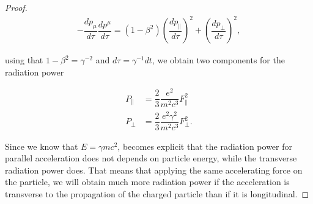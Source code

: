 \documentclass[../sands-adaptation.tex]{subfiles}
\begin{document}
\begin{proof}
 \begin{align*}
 -\dfrac{d{p_\mu}}{d\tau}\dfrac{dp^\mu}{d\tau} = (1- \beta^2)\left(\dfrac{dp_\parallel}{d\tau}\right)^2 + \left(\dfrac{dp_\perp}{d\tau}\right)^2,
 \end{align*}

 using that $1-\beta^2 = \gamma^{-2}$ and $d\tau = \gamma^{-1}dt$, we obtain two components for the radiation power

\begin{align*}
P_\parallel &=   \dfrac{2}{3}\dfrac{e^2}{m^2c^3}F_\parallel^2 \\
P_\perp &=   \dfrac{2}{3}\dfrac{e^2 \gamma^2}{m^2c^3}F_\perp^2 .
\end{align*}

Since we know that $E = \gamma mc^2$, becomes explicit that the radiation power for parallel acceleration does not depends on particle energy, while the transverse radiation power does. That means that applying the same accelerating force on the particle, we will obtain much more radiation power if the acceleration
is transverse to the propagation of the charged particle than if it is longitudinal.
\end{proof}
\end{document}
